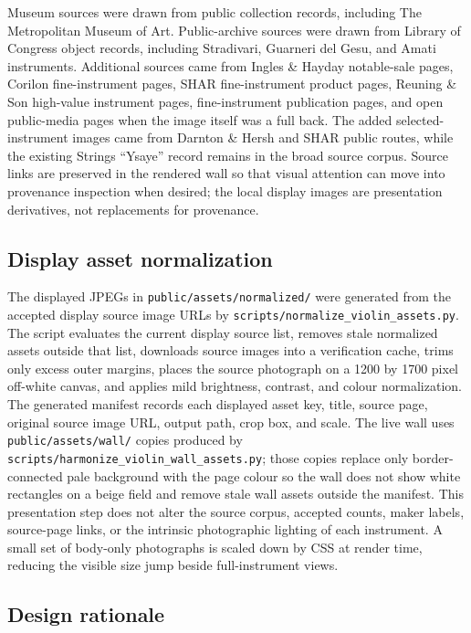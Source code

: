 \documentclass[12pt,letterpaper]{article}
\begin{document}
Museum sources were drawn from public collection records, including The Metropolitan Museum of Art. Public-archive sources were drawn from Library of Congress object records, including Stradivari, Guarneri del Gesu, and Amati instruments. Additional sources came from Ingles \& Hayday notable-sale pages, Corilon fine-instrument pages, SHAR fine-instrument product pages, Reuning \& Son high-value instrument pages, fine-instrument publication pages, and open public-media pages when the image itself was a full back. The added selected-instrument images came from Darnton \& Hersh and SHAR public routes, while the existing Strings ``Ysaye'' record remains in the broad source corpus. Source links are preserved in the rendered wall so that visual attention can move into provenance inspection when desired; the local display images are presentation derivatives, not replacements for provenance.

\subsection*{Display asset normalization}

The displayed JPEGs in \texttt{public/assets/normalized/} were generated from the accepted display source image URLs by \texttt{scripts/normalize\_violin\_assets.py}. The script evaluates the current display source list, removes stale normalized assets outside that list, downloads source images into a verification cache, trims only excess outer margins, places the source photograph on a 1200 by 1700 pixel off-white canvas, and applies mild brightness, contrast, and colour normalization. The generated manifest records each displayed asset key, title, source page, original source image URL, output path, crop box, and scale. The live wall uses \texttt{public/assets/wall/} copies produced by \texttt{scripts/harmonize\_violin\_wall\_assets.py}; those copies replace only border-connected pale background with the page colour so the wall does not show white rectangles on a beige field and remove stale wall assets outside the manifest. This presentation step does not alter the source corpus, accepted counts, maker labels, source-page links, or the intrinsic photographic lighting of each instrument. A small set of body-only photographs is scaled down by CSS at render time, reducing the visible size jump beside full-instrument views.

\subsection*{Design rationale}
\end{document}
